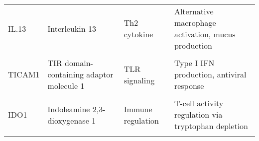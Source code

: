 \begin{table}
{\begin{tabular}[t]{llll}
IL.13 & Interleukin 13 & Th2 cytokine & Alternative macrophage activation, mucus production\\
\cellcolor{gray!10}{IRGM1} & \cellcolor{gray!10}{Immunity-related GTPase M1} & \cellcolor{gray!10}{Intracellular defense} & \cellcolor{gray!10}{Autonomous cell defense, parasite clearance}\\
\addlinespace
TICAM1 & TIR domain-containing adaptor molecule 1 & TLR signaling & Type I IFN production, antiviral response\\
\cellcolor{gray!10}{SOCS1} & \cellcolor{gray!10}{Suppressor of cytokine signaling 1} & \cellcolor{gray!10}{Immune regulation} & \cellcolor{gray!10}{JAK/STAT pathway regulation, T-cell differentiation}\\
IDO1 & Indoleamine 2,3-dioxygenase 1 & Immune regulation & T-cell activity regulation via tryptophan depletion\\
\cellcolor{gray!10}{PRF1} & \cellcolor{gray!10}{Perforin 1} & \cellcolor{gray!10}{Cytotoxic effector} & \cellcolor{gray!10}{Cytotoxic granule protein, target cell lysis}\\
\bottomrule
\end{tabular}}
\end{table}
